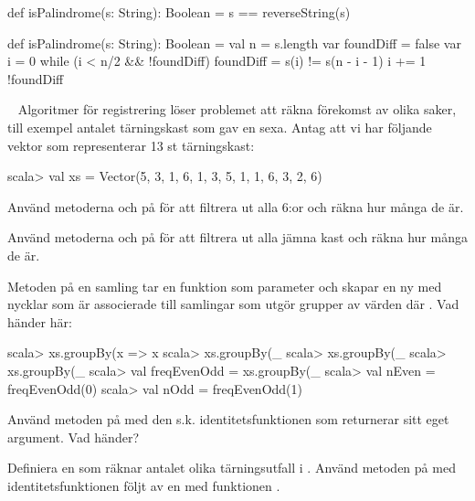 \SubtaskSolved  \begin{Code}
def isPalindrome(s: String): Boolean = {s == reverseString(s)}
\end{Code}

\SubtaskSolved  \begin{Code}
def isPalindrome(s: String): Boolean = {
  val n = s.length
  var foundDiff = false
  var i = 0
  while (i < n/2 && !foundDiff)  {
    foundDiff = s(i) != s(n - i - 1)
    i += 1
  }
  !foundDiff
}
\end{Code}



\QUESTEND









\QUESTBEGIN

\Task \label{task:seq-reg} \what~   Algoritmer för registrering löser problemet att räkna förekomst av olika saker, till exempel antalet tärningskast som gav en sexa. Antag att vi har följande vektor  som representerar 13 st tärningskast:
\begin{REPL}
scala> val xs = Vector(5, 3, 1, 6, 1, 3, 5, 1, 1, 6, 3, 2, 6)
\end{REPL}
\Subtask Använd metoderna  och  på  för att filtrera ut alla 6:or och räkna hur många de är.

\Subtask Använd metoderna  och  på  för att filtrera ut alla jämna kast och räkna hur många de är.

\Subtask Metoden  på en samling tar en funktion  som parameter och skapar en ny  med nycklar  som är associerade till samlingar som utgör grupper av värden där
.  Vad händer här:
\begin{REPL}
scala> xs.groupBy(x => x %
scala> xs.groupBy(_ %
scala> xs.groupBy(_ %
scala> xs.groupBy(_ %
scala> val freqEvenOdd = xs.groupBy(_ %
scala> val nEven = freqEvenOdd(0)
scala> val nOdd = freqEvenOdd(1)
\end{REPL}
\Subtask Använd metoden  på  med den s.k. identitetsfunktionen  som returnerar sitt eget argument. Vad händer?

\Subtask Definiera en  som räknar antalet olika tärningsutfall i . Använd metoden  på  med identitetsfunktionen följt av en  med funktionen .

